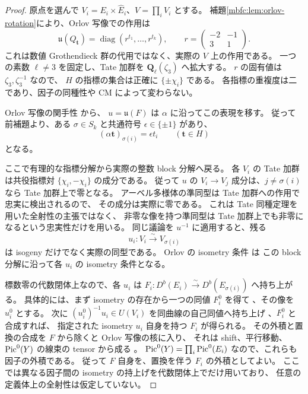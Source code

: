 \begin{proof}
原点を選んで $V_i=E_i\times\widehat E_i$、$V=\prod_iV_i$ とする。
補題\ref{mbfc:lem:orlov-rotation}により、Orlov 写像での作用は
\[
 \mathfrak u(Q_{\mathbf t})
       =\operatorname{diag}(r^{t_1},\ldots,r^{t_k}),\qquad
 r=\begin{pmatrix}-2&-1\\3&1\end{pmatrix}.
\]
これは数値 Grothendieck 群の代用ではなく、実際の $V$ 上の作用である。
一つの素数 $\ell\ne3$ を固定し、Tate 加群を
$\mathbf Q_\ell(\zeta_3)$ へ拡大する。
$r$ の固有値は $\zeta_3,\zeta_3^{-1}$ なので、
$H$ の指標の集合は正確に $\{\pm\chi_i\}$ である。
各指標の重複度は二であり、因子の同種性や CM によって変わらない。

Orlov 写像の関手性
\cite[Proposition~2.15]{MBFCOrlovAbelian}から、
$u=\mathfrak u(F)$ は $\alpha$ に沿ってこの表現を移す。
従って前補題より、ある $\sigma\in S_k$ と共通符号
$\epsilon\in\{\pm1\}$ があり、
\[
 (\alpha\mathbf t)_{\sigma(i)}=\epsilon t_i
 \qquad(\mathbf t\in H)
\]
となる。

ここで有理的な指標分解から実際の整数 block 分解へ戻る。
各 $V_i$ の Tate 加群は共役指標対 $\{\chi_i,-\chi_i\}$ の成分である。
従って $u$ の $V_i\to V_j$ 成分は、$j\ne\sigma(i)$ なら
Tate 加群上で零となる。
アーベル多様体の準同型は Tate 加群への作用で忠実に検出されるので、
その成分は実際に零である。
これは Tate 同種定理を用いた全射性の主張ではなく、
非零な像を持つ準同型は Tate 加群上でも非零になるという忠実性だけを用いる。
同じ議論を $u^{-1}$ に適用すると、残る
\[
 u_i:V_i\xrightarrow{\sim}V_{\sigma(i)}
\]
は isogeny だけでなく実際の同型である。
Orlov の isometry 条件
\cite[Definition~2.17, Proposition~2.18]{MBFCOrlovAbelian}は
この block 分解に沿って各 $u_i$ の isometry 条件となる。

標数零の代数閉体上なので、各 $u_i$ は
$F_i:D^b(E_i)\xrightarrow{\sim}D^b(E_{\sigma(i)})$ へ持ち上がる。
具体的には、まず isometry の存在から一つの同値 $F_i^0$ を得て
\cite[Theorem~4.13]{MBFCOrlovAbelian}、その像を $u_i^0$ とする。
次に $(u_i^0)^{-1}u_i\in U(V_i)$ を同曲線の自己同値へ持ち上げ
\cite[Theorem~4.14]{MBFCOrlovAbelian}、$F_i^0$ と合成すれば、
指定された isometry $u_i$ 自身を持つ $F_i$ が得られる。
その外積と置換の合成を $F$ から除くと Orlov 写像の核に入り、
それは shift、平行移動、$\operatorname{Pic}^0(Y)$ の線束の tensor から成る
\cite[Proposition~3.3]{MBFCOrlovAbelian}。
$\operatorname{Pic}^0(Y)=\prod_i\operatorname{Pic}^0(E_i)$ なので、これらも因子の外積である。
従って $F$ 自身を、置換を伴う $F_i$ の外積としてよい。
ここでは異なる因子間の isometry の持上げを代数閉体上でだけ用いており、
任意の定義体上の全射性は仮定していない。


\end{proof}
